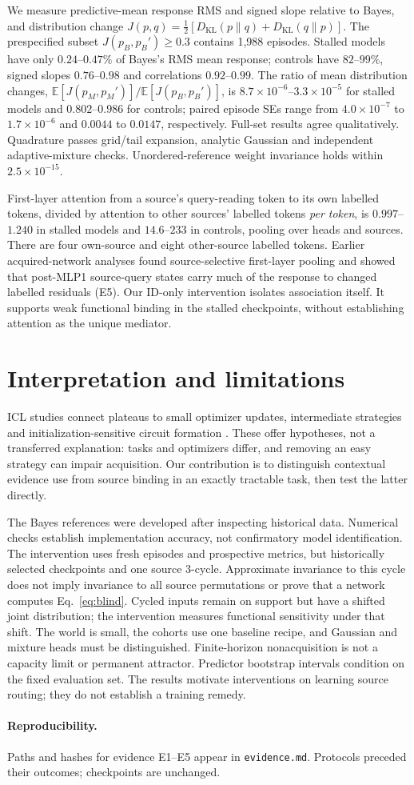 \documentclass[10pt]{article}
\newcommand{\E}{\mathbb{E}}
\newcommand{\KL}{D_{\mathrm{KL}}}
\begin{document}
We measure predictive-mean response RMS and signed slope relative to Bayes,
and distribution change $J(p,q)=\tfrac12[\KL(p\|q)+\KL(q\|p)]$.
The prespecified subset $J(p_B,p_B')\geq0.3$ contains 1,988 episodes.
Stalled models have only $0.24$--$0.47\%$ of Bayes's RMS mean response;
controls have $82$--$99\%$, signed slopes $0.76$--$0.98$ and correlations
$0.92$--$0.99$. The ratio of mean distribution changes,
$\E[J(p_M,p_M')]/\E[J(p_B,p_B')]$, is
$8.7\times10^{-6}$--$3.3\times10^{-5}$ for stalled models and
$0.802$--$0.986$ for controls; paired episode SEs range from
$4.0\times10^{-7}$ to $1.7\times10^{-6}$ and $0.0044$ to $0.0147$,
respectively. Full-set results agree qualitatively.
Quadrature passes grid/tail expansion, analytic Gaussian and independent
adaptive-mixture checks. Unordered-reference weight invariance holds within
$2.5\times10^{-15}$.

First-layer attention from a source's query-reading token to its own labelled
tokens, divided by attention to other sources' labelled tokens \emph{per token},
is $0.997$--$1.240$ in stalled models and $14.6$--$233$ in controls, pooling
over heads and sources. There are four own-source and eight other-source labelled
tokens. Earlier acquired-network analyses found source-selective first-layer
pooling and showed that post-MLP1 source-query states carry much of the response
to changed labelled residuals (E5). Our ID-only intervention isolates association
itself. It supports weak functional binding in the stalled checkpoints, without
establishing attention as the unique mediator.

\section{Interpretation and limitations}
ICL studies connect plateaus to small optimizer updates, intermediate strategies
and initialization-sensitive circuit formation
\citep{kirsch2022,reddy2023,nguyen2024}. These offer hypotheses, not a transferred
explanation: tasks and optimizers differ, and removing an easy strategy can
impair acquisition. Our contribution is to distinguish contextual evidence use
from source binding in an exactly tractable task, then test the latter directly.

The Bayes references were developed after inspecting historical data. Numerical
checks establish implementation accuracy, not confirmatory model identification.
The intervention uses fresh episodes and prospective metrics, but historically
selected checkpoints and one source 3-cycle. Approximate invariance to this
cycle does not imply invariance to all source permutations or prove that a
network computes Eq.~\eqref{eq:blind}. Cycled inputs remain on support but have
a shifted joint distribution; the intervention measures functional sensitivity
under that shift. The world is small, the cohorts use one
baseline recipe, and Gaussian and mixture heads must be distinguished.
Finite-horizon nonacquisition is not a capacity limit or permanent attractor.
Predictor bootstrap intervals condition on the fixed evaluation set. The results
motivate interventions on learning source routing; they do not establish a
training remedy.

\paragraph{Reproducibility.}
Paths and hashes for evidence E1--E5 appear in \texttt{evidence.md}.
Protocols preceded their outcomes; checkpoints are unchanged.



\end{document}
